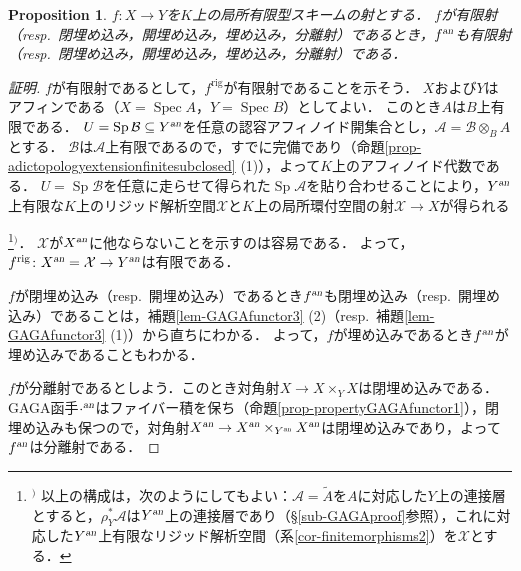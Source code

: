 \documentclass[a4paper,12pt, dvipdfmx]{jsbook}
\def\til#1{\widetilde{#1}}%
\def\rig{\mathop{\mathrm{rig}}\nolimits}
\def\Spec{\mathop{\mathrm{Spec}}\nolimits}
\def\Sp{\mathop{\mathrm{Sp}}\nolimits}
\def\an{\textsl{an}}
\theoremstyle{plain}
\newtheorem{prop}[thm]{\bfseries Proposition}
\theoremstyle{definition}
\newcounter{chushaku}
\def\chu#1{\addtocounter{chushaku}{1}\footnote[\value{chushaku}]{${}^)$ #1}${}^)$}
\begin{document}
\begin{prop}\label{prop-propertyGAGAfunctor2}{\rm 
$f\colon X\rightarrow Y$を$K$上の局所有限型スキームの射とする．
$f$が有限射（resp.\ 閉埋め込み，開埋め込み，埋め込み，分離射）であるとき，$f^{\an}$も有限射（resp.\ 閉埋め込み，開埋め込み，埋め込み，分離射）である．}
\end{prop}

\begin{proof}[証明]
$f$が有限射であるとして，$f^{\rig}$が有限射であることを示そう．
$X$および$Y$はアフィンである（$X=\Spec A$，$Y=\Spec B$）としてよい．
このとき$A$は$B$上有限である．
$U=\Sp\mathcal{B}\subseteq Y^{\an}$を任意の認容アフィノイド開集合とし，$\mathcal{A}=\mathcal{B}\otimes_BA$とする．
$\mathcal{B}$は$\mathcal{A}$上有限であるので，すでに完備であり（命題\ref{prop-adictopologyextensionfinitesubclosed} (1)），よって$K$上のアフィノイド代数である．
$U=\Sp\mathcal{B}$を任意に走らせて得られた$\Sp\mathcal{A}$を貼り合わせることにより，$Y^{\an}$上有限な$K$上のリジッド解析空間$\mathcal{X}$と$K$上の局所環付空間の射$\mathcal{X}\rightarrow X$が得られる\chu{以上の構成は，次のようにしてもよい：$\mathscr{A}=\til{A}$を$A$に対応した$Y$上の連接層とすると，$\rho^{\ast}_Y\mathscr{A}$は$Y^{\an}$上の連接層であり（\S\ref{sub-GAGAproof}参照），これに対応した$Y^{\an}$上有限なリジッド解析空間（系\ref{cor-finitemorphisms2}）を$\mathcal{X}$とする．}．
$\mathcal{X}$が$X^{\an}$に他ならないことを示すのは容易である．
よって，$f^{\rig}\colon X^{\an}=\mathcal{X}\rightarrow Y^{\an}$は有限である．

$f$が閉埋め込み（resp.\ 開埋め込み）であるとき$f^{\an}$も閉埋め込み（resp.\ 開埋め込み）であることは，補題\ref{lem-GAGAfunctor3} (2)（resp.\ 補題\ref{lem-GAGAfunctor3} (1)）から直ちにわかる．
よって，$f$が埋め込みであるとき$f^{\an}$が埋め込みであることもわかる．

$f$が分離射であるとしよう．このとき対角射$X\rightarrow X\times_YX$は閉埋め込みである．
GAGA函手$\cdot^{\an}$はファイバー積を保ち（命題\ref{prop-propertyGAGAfunctor1}），閉埋め込みも保つので，対角射$X^{\an}\rightarrow X^{\an}\times_{Y^{\an}}X^{\an}$は閉埋め込みであり，よって$f^{\an}$は分離射である．
\end{proof}
\end{document}
